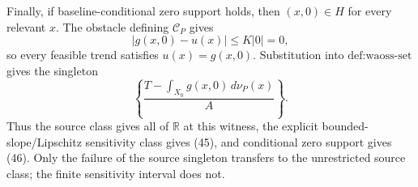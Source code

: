 Finally, if baseline-conditional zero support holds, then \((x,0)\in H\) for every relevant \(x\). The obstacle defining \(\mathcal C_P\) gives
\[
|g(x,0)-u(x)|\leq K|0|=0,
\]
so every feasible trend satisfies \(u(x)=g(x,0)\). Substitution into \(\text{def:waoss-set}\) gives the singleton
\[
\left\{\frac{T-\int_{X_0}g(x,0)\,d\nu_P(x)}{A}\right\}. \tag{46}
\]
Thus the source class gives all of \(\mathbb R\) at this witness, the explicit bounded-slope/Lipschitz sensitivity class gives (45), and conditional zero support gives (46). Only the failure of the source singleton transfers to the unrestricted source class; the finite sensitivity interval does not.
